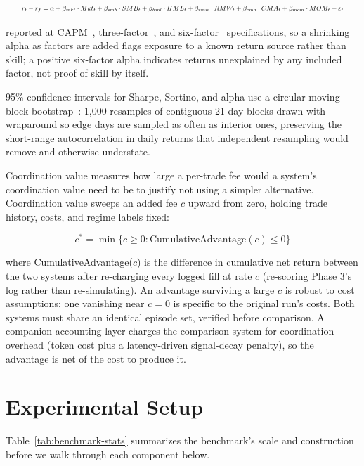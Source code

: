\documentclass{article}
\begin{document}
\begin{equation*}
\resizebox{0.95\textwidth}{!}{$\displaystyle
r_t - r_f = \alpha + \beta_{mkt}\cdot Mkt_t + \beta_{smb}\cdot SMB_t + \beta_{hml}\cdot HML_t + \beta_{rmw}\cdot RMW_t + \beta_{cma}\cdot CMA_t + \beta_{mom}\cdot MOM_t + \varepsilon_t
$}
\end{equation*}

reported at CAPM~\cite{sharpe1964}, three-factor~\cite{fama1993}, and six-factor~\cite{fama2015,carhart1997} specifications, so a shrinking alpha as factors are added flags exposure to a known return source rather than skill; a positive six-factor alpha indicates returns unexplained by any included factor, not proof of skill by itself.

95\% confidence intervals for Sharpe, Sortino, and alpha use a circular moving-block bootstrap~\cite{politis1992,kunsch1989}: 1,000 resamples of contiguous 21-day blocks drawn with wraparound so edge days are sampled as often as interior ones, preserving the short-range autocorrelation in daily returns that independent resampling would remove and otherwise understate.

Coordination value measures how large a per-trade fee would a system's coordination value need to be to justify not using a simpler alternative. Coordination value sweeps an added fee $c$ upward from zero, holding trade history, costs, and regime labels fixed:

\[
c^* = \min\{c \geq 0 : \text{CumulativeAdvantage}(c) \leq 0\}
\]

where CumulativeAdvantage($c$) is the difference in cumulative net return between the two systems after re-charging every logged fill at rate $c$ (re-scoring Phase 3's log rather than re-simulating). An advantage surviving a large $c$ is robust to cost assumptions; one vanishing near $c=0$ is specific to the original run's costs. Both systems must share an identical episode set, verified before comparison. A companion accounting layer charges the comparison system for coordination overhead (token cost plus a latency-driven signal-decay penalty), so the advantage is net of the cost to produce it.

\section{Experimental Setup}

Table~\ref{tab:benchmark-stats} summarizes the benchmark's scale and construction before we walk through each component below.
\end{document}
